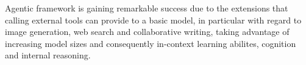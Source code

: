 Agentic framework is gaining remarkable success due to the extensions that calling external tools can provide to a basic model, in particular with regard to image generation, web search and collaborative writing, taking advantage of increasing model sizes and consequently in-context learning abilites, cognition and internal reasoning.